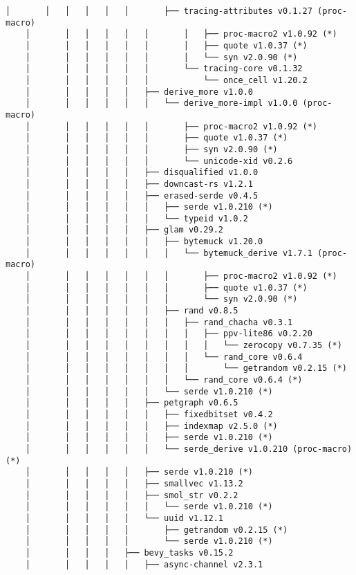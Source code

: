 \begin{lstlisting}[style=mystyle, caption={dependencias del proyecto}, label={lst:dependencias}]
    │       │   │   │   │   │       ├── tracing-attributes v0.1.27 (proc-macro)
    │       │   │   │   │   │       │   ├── proc-macro2 v1.0.92 (*)
    │       │   │   │   │   │       │   ├── quote v1.0.37 (*)
    │       │   │   │   │   │       │   └── syn v2.0.90 (*)
    │       │   │   │   │   │       └── tracing-core v0.1.32
    │       │   │   │   │   │           └── once_cell v1.20.2
    │       │   │   │   │   ├── derive_more v1.0.0
    │       │   │   │   │   │   └── derive_more-impl v1.0.0 (proc-macro)
    │       │   │   │   │   │       ├── proc-macro2 v1.0.92 (*)
    │       │   │   │   │   │       ├── quote v1.0.37 (*)
    │       │   │   │   │   │       ├── syn v2.0.90 (*)
    │       │   │   │   │   │       └── unicode-xid v0.2.6
    │       │   │   │   │   ├── disqualified v1.0.0
    │       │   │   │   │   ├── downcast-rs v1.2.1
    │       │   │   │   │   ├── erased-serde v0.4.5
    │       │   │   │   │   │   ├── serde v1.0.210 (*)
    │       │   │   │   │   │   └── typeid v1.0.2
    │       │   │   │   │   ├── glam v0.29.2
    │       │   │   │   │   │   ├── bytemuck v1.20.0
    │       │   │   │   │   │   │   └── bytemuck_derive v1.7.1 (proc-macro)
    │       │   │   │   │   │   │       ├── proc-macro2 v1.0.92 (*)
    │       │   │   │   │   │   │       ├── quote v1.0.37 (*)
    │       │   │   │   │   │   │       └── syn v2.0.90 (*)
    │       │   │   │   │   │   ├── rand v0.8.5
    │       │   │   │   │   │   │   ├── rand_chacha v0.3.1
    │       │   │   │   │   │   │   │   ├── ppv-lite86 v0.2.20
    │       │   │   │   │   │   │   │   │   └── zerocopy v0.7.35 (*)
    │       │   │   │   │   │   │   │   └── rand_core v0.6.4
    │       │   │   │   │   │   │   │       └── getrandom v0.2.15 (*)
    │       │   │   │   │   │   │   └── rand_core v0.6.4 (*)
    │       │   │   │   │   │   └── serde v1.0.210 (*)
    │       │   │   │   │   ├── petgraph v0.6.5
    │       │   │   │   │   │   ├── fixedbitset v0.4.2
    │       │   │   │   │   │   ├── indexmap v2.5.0 (*)
    │       │   │   │   │   │   ├── serde v1.0.210 (*)
    │       │   │   │   │   │   └── serde_derive v1.0.210 (proc-macro) (*)
    │       │   │   │   │   ├── serde v1.0.210 (*)
    │       │   │   │   │   ├── smallvec v1.13.2
    │       │   │   │   │   ├── smol_str v0.2.2
    │       │   │   │   │   │   └── serde v1.0.210 (*)
    │       │   │   │   │   └── uuid v1.12.1
    │       │   │   │   │       ├── getrandom v0.2.15 (*)
    │       │   │   │   │       └── serde v1.0.210 (*)
    │       │   │   │   ├── bevy_tasks v0.15.2
    │       │   │   │   │   ├── async-channel v2.3.1

\end{lstlisting}
